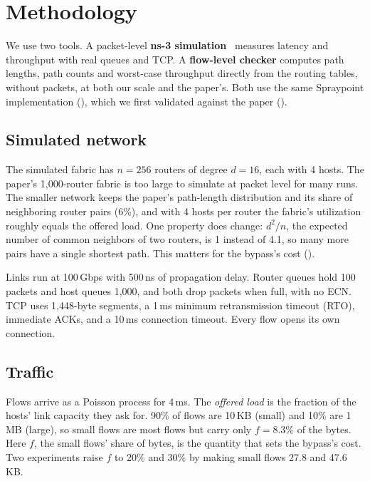 \section{Methodology}
\label{sec:method}

We use two tools. A packet-level \textbf{ns-3 simulation}~\cite{ns3} measures latency and throughput with real queues and TCP. A \textbf{flow-level checker} computes path lengths, path counts and worst-case throughput directly from the routing tables, without packets, at both our scale and the paper's. Both use the same Spraypoint implementation (), which we first validated against the paper ().

\subsection{Simulated network}

The simulated fabric has $n = 256$ routers of degree $d = 16$, each with 4 hosts. The paper's 1{,}000-router fabric is too large to simulate at packet level for many runs. The smaller network keeps the paper's path-length distribution and its share of neighboring router pairs (6\%), and with 4 hosts per router the fabric's utilization roughly equals the offered load. One property does change: $d^2/n$, the expected number of common neighbors of two routers, is 1 instead of 4.1, so many more pairs have a single shortest path. This matters for the bypass's cost ().

Links run at 100\,Gbps with 500\,ns of propagation delay. Router queues hold 100 packets and host queues 1{,}000, and both drop packets when full, with no ECN. TCP uses 1{,}448-byte segments, a 1\,ms minimum retransmission timeout (RTO), immediate ACKs, and a 10\,ms connection timeout. Every flow opens its own connection.

\subsection{Traffic}

Flows arrive as a Poisson process for 4\,ms. The \emph{offered load} is the fraction of the hosts' link capacity they ask for. 90\% of flows are 10\,KB (small) and 10\% are 1\,MB (large), so small flows are most flows but carry only $f = 8.3\%$ of the bytes. Here $f$, the small flows' share of bytes, is the quantity that sets the bypass's cost. Two experiments raise $f$ to 20\% and 30\% by making small flows 27.8 and 47.6\,KB.

